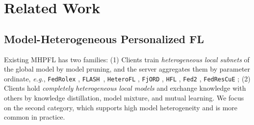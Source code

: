 \documentclass[sigconf]{acmart}
\newcommand{\hetero}{heterogeneous }
\newcommand{\persN}{personalization }
\newcommand{\methodname}{{\tt{pFedMoE}}}
\begin{document}


\section{Related Work}\label{sec:related}
\subsection{Model-Heterogeneous Personalized FL}
Existing MHPFL has two families: (1) Clients train \textit{heterogeneous local subnets} of the global model by model pruning, and the server aggregates them by parameter ordinate, \emph{e.g.}, {\tt{FedRolex}} \citep{FedRolex}, {\tt{FLASH}}~\citep{FLASH}, {\tt{HeteroFL}} \citep{HeteroFL}, {\tt{FjORD}} \citep{FjORD}, {\tt{HFL}} \citep{HFL}, {\tt{Fed2}} \citep{Fed2}, {\tt{FedResCuE}} \citep{FedResCuE}; (2) Clients hold \textit{completely heterogeneous local models} and exchange knowledge with others by knowledge distillation, model mixture, and mutual learning. We focus on the second category, which supports high model heterogeneity and is more common in practice.
\end{document}
